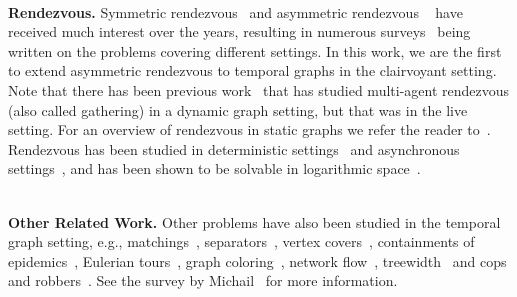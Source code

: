 ~\\ \noindent \textbf{Rendezvous.} 
%
Symmetric rendezvous~\cite{Alpern76} and asymmetric rendezvous ~\cite{Alpern95}
have received much interest over the years, resulting in numerous
surveys~\cite{Alpern02,AlpernG06,Flocchini19,KranakisKM22,KranakisKR06,Pelc12,Pelc19}
being written on the problems covering different settings. 
In this work, we are
the first to extend asymmetric rendezvous to temporal graphs in the clairvoyant
setting. Note that there has been previous
work~\cite{BournatDP18,DasDPP19,DiLunaFPPSV20,MichailST21,OoshitaD18,ShibataKESNK23,ShibataSNK21}
that has studied multi-agent rendezvous (also called gathering) in a dynamic
graph setting, but that was in the live setting. 
%
For an overview of rendezvous in static graphs we refer the reader to~\cite{AlpernG06,
KranakisKR06}. Rendezvous has been studied in deterministic
settings~\cite{BhagatP22,Pelc23} and asynchronous
settings~\cite{dieudonne2013meet,MARCO2006315}, and has been shown to be
solvable in logarithmic space~\cite{CzyzowiczJKAP10}.

~\\ \noindent \textbf{Other Related Work.}  
Other problems have also been studied in the temporal graph setting, e.g.,
matchings~\cite{MertziosMNZZ20},
separators~\cite{FLUSCHNIK2020197,ZSCHOCHE202072}, vertex
covers~\cite{AKRIDA2020108,HammKMS22}, containments of
epidemics~\cite{ENRIGHT202160}, Eulerian tours~\cite{BumpusM23,MarinoS21}, graph
coloring~\cite{MarinoS22,MertziosMZ21}, network flow~\cite{AKRIDA201946},
treewidth~\cite{Fluschnik2020} and cops and robbers~\cite{Erlebach-Spooner/20,MorawietzRW20}. See
the survey by Michail~\cite{Michail16} for more information.
